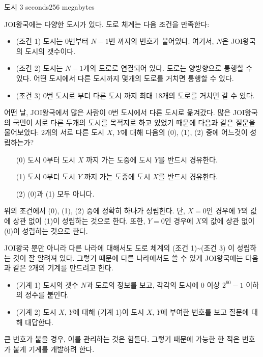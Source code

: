 \begin{problem}{도시}
	{}{}
	{3 seconds}{256 megabytes}{}
	
	JOI왕국에는 다양한 도시가 있다. 도로 체계는 다음 조건을 만족한다:
	
	\begin{itemize}
		\item (조건 1) 도시는 0번부터 $N-1$번 까지의 번호가 붙어있다. 여기서, $N$은 JOI왕국의 도시의 갯수이다.
		\item (조건 2) 도시는 $N-1$개의 도로로 연결되어 있다. 도로는 양방향으로 통행할 수 있다. 어떤 도시에서 다른 도시까지 몇개의 도로를 거치면 통행할 수 있다.
		\item (조건 3) 0번 도시로 부터 다른 도시 까지 최대 18개의 도로를 거치면 갈 수 있다.
	\end{itemize}

	어떤 날, JOI왕국에서 많은 사람이 0번 도시에서 다른 도시로 옮겨갔다. 많은 JOI왕국의 국민이 서로 다른 두개의 도시를 목적지로 하고 있었기 때문에 다음과 같은 질문을 물어보았다: 2개의 서로 다른 도시 $X$, $Y$에 대해 다음의 (0), (1), (2) 중에 어느것이 성립하는가?
	
	\begin{enumerate}
		\item [(0)] 도시 0부터 도시 $X$ 까지 가는 도중에 도시 $Y$를 반드시 경유한다.
		\item [(1)] 도시 0부터 도시 $Y$ 까지 가는 도중에 도시 $X$를 반드시 경유한다.
		\item [(2)] (0)과 (1) 모두 아니다.
	\end{enumerate}

	위의 조건에서 (0), (1), (2) 중에 정확히 하나가 성립한다. 단, $X=0$인 경우에 $Y$의 값에 상관 없이 (1)이 성립하는 것으로 한다. 또한, $Y=0$인 경우에 $X$의 값에 상관 없이 (0)이 성립하는 것으로 한다.
	
	JOI왕국 뿐만 아니라 다른 나라에 대해서도 도로 체계의 (조건 1)\textasciitilde (조건 3) 이 성립하는 것이 잘 알려져 있다. 그렇기 때문에 다른 나라에서도 쓸 수 있게 JOI왕국에는 다음과 같은 2개의 기계를 만드려고 한다.
	
	\begin{itemize}
		\item (기계 1) 도시의 갯수 $N$과 도로의 정보를 보고, 각각의 도시에 0 이상 $2^{60}-1$ 이하의 정수를 붙인다.
		\item (기계 2) 도시 $X$, $Y$에 대해 (기계 1)이 도시 $X$, $Y$에 부여한 번호를 보고 질문에 대해 대답한다.
	\end{itemize}
	
	큰 번호가 붙을 경우, 이를 관리하는 것은 힘들다. 그렇기 때문에 가능한 한 적은 번호가 붙게 기계를 개발하려 한다.
	

\end{problem}
